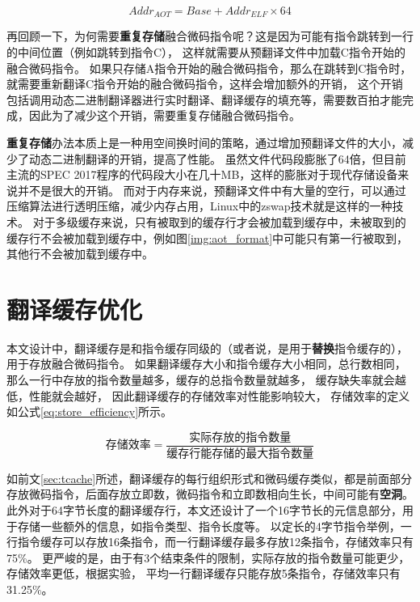 \begin{equation}
Addr_{AOT} = Base +  Addr_{ELF} \times 64 
\end{equation}

再回顾一下，为何需要\textbf{重复存储}融合微码指令呢？这是因为可能有指令跳转到一行的中间位置（例如跳转到指令C），
这样就需要从预翻译文件中加载C指令开始的融合微码指令。
如果只存储A指令开始的融合微码指令，那么在跳转到C指令时，就需要重新翻译C指令开始的融合微码指令，这样会增加额外的开销，
这个开销包括调用动态二进制翻译器进行实时翻译、翻译缓存的填充等，需要数百拍才能完成，因此为了减少这个开销，需要重复存储融合微码指令。


\textbf{重复存储}办法本质上是一种用空间换时间的策略，通过增加预翻译文件的大小，减少了动态二进制翻译的开销，提高了性能。
虽然文件代码段膨胀了64倍，但目前主流的SPEC 2017程序的代码段大小在几十MB，这样的膨胀对于现代存储设备来说并不是很大的开销。
而对于内存来说，预翻译文件中有大量的空行，可以通过压缩算法进行透明压缩，减少内存占用，Linux中的zswap技术就是这样的一种技术。
对于多级缓存来说，只有被取到的缓存行才会被加载到缓存中，未被取到的缓存行不会被加载到缓存中，例如图\ref{img:aot_format}中可能只有第一行被取到，其他行不会被加载到缓存中。


\section{翻译缓存优化}

本文设计中，翻译缓存是和指令缓存同级的（或者说，是用于\textbf{替换}指令缓存的），用于存放融合微码指令。
如果翻译缓存大小和指令缓存大小相同，总行数相同，那么一行中存放的指令数量越多，缓存的总指令数量就越多，
缓存缺失率就会越低，性能就会越好，
因此翻译缓存的存储效率对性能影响较大，
存储效率的定义如公式\ref{eq:store_efficiency}所示。

\begin{equation} \label{eq:store_efficiency}
  \text{存储效率} = \frac{\text{实际存放的指令数量}}{\text{缓存行能存储的最大指令数量}}
\end{equation}


如前文\ref{sec:tcache}所述，翻译缓存的每行组织形式和微码缓存类似，都是前面部分存放微码指令，后面存放立即数，微码指令和立即数相向生长，中间可能有\textbf{空洞}。
此外对于64字节长度的翻译缓存行，本文还设计了一个16字节长的元信息部分，用于存储一些额外的信息，如指令类型、指令长度等。
以定长的4字节指令举例，一行指令缓存可以存放16条指令，而一行翻译缓存最多存放12条指令，存储效率只有75\%。
更严峻的是，由于有3个结束条件的限制，实际存放的指令数量可能更少，存储效率更低，根据实验，
平均一行翻译缓存只能存放5条指令，存储效率只有31.25\%。

